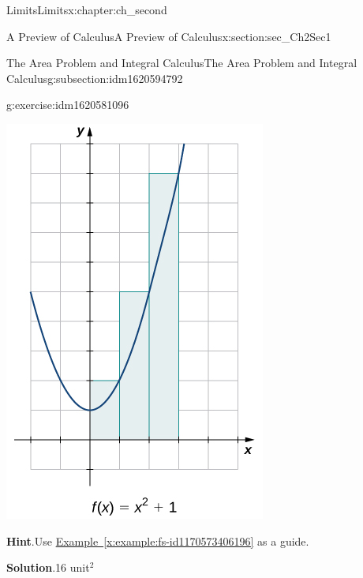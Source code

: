 \documentclass[oneside,10pt,]{book}
\newcommand{\blocktitlefont}{\relax}
\newcommand{\xreffont}{\relax}
\numberwithin{equation}{section}
\begin{document}
\begin{chapterptx}{Limits}{}{Limits}{}{}{x:chapter:ch_second}
\begin{sectionptx}{A Preview of Calculus}{}{A Preview of Calculus}{}{}{x:section:sec_Ch2Sec1}
\begin{subsectionptx}{The Area Problem and Integral Calculus}{}{The Area Problem and Integral Calculus}{}{}{g:subsection:idm1620594792}
\begin{inlineexercise}{}{g:exercise:idm1620581096}
\begin{image}{0.25}{0.5}{0.25}%
\includegraphics[width=\linewidth]{external/CNX_Calc_Figure_02_01_009.jpg}
\end{image}%
\par\smallskip%
\noindent\textbf{\blocktitlefont Hint}.\hypertarget{g:hint:idm1620577000}{}\quad{}Use \hyperref[x:example:fs-id1170573406196]{Example~{\xreffont\ref{x:example:fs-id1170573406196}}} as a guide.%
\par\smallskip%
\noindent\textbf{\blocktitlefont Solution}.\hypertarget{g:solution:idm1620580328}{}\quad{}16 unit\(^2\)%
\end{inlineexercise}%
\end{subsectionptx}
%
%
\typeout{************************************************}

\end{sectionptx}
\end{chapterptx}
\end{document}
